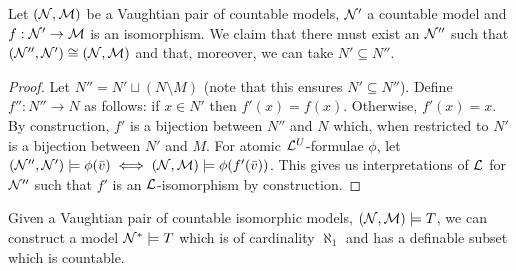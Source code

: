 \begin{lemma}\label{lemma_extend_isomorphically}
Let \((\mathcal{N}, \mathcal{M})\) be a Vaughtian pair of countable models, \(\mathcal{N}'\) a countable model and \(f:\mathcal{N}' \to \mathcal{M}\) is an isomorphism. 
We claim that there must exist an \(\mathcal{N}''\) such that \((\mathcal{N}'', \mathcal{N}') \cong (\mathcal{N}, \mathcal{M})\) and that, moreover, we can take \(N' \subseteq N''\). 
\end{lemma}

\begin{proof}
Let \(N'' = N' \sqcup (N \setminus M)\) (note that this ensures \(N' \subseteq N''\)).
Define \(f'': N'' \to N\) as follows: if \(x \in N'\) then \(f'(x) = f(x)\). 
Otherwise, \(f'(x) = x\). 
By construction, \(f'\) is a bijection between \(N''\) and \(N\) which, when restricted to \(N'\) is a bijection between  \(N'\) and \(M\). 
For atomic \(\mathcal{L}^U\)-formulae \(\phi\), let \((\mathcal{N}'', \mathcal{N}') \models \phi(\bar{v}) \iff (\mathcal{N}, \mathcal{M}) \models \phi(f'(\bar{v}))\).
This gives us interpretations of \(\mathcal{L}\) for \(\mathcal{N}''\) such that \(f'\) is an \(\mathcal{L}\)-isomorphism by construction. 
\end{proof}

\begin{theorem}\label{theorem_aleph_one_vaughtian_pair}
Given a Vaughtian pair of countable isomorphic models, \((\mathcal{N}, \mathcal{M}) \models T\), we can construct a model \(\mathcal{N}^* \models T\) which is of cardinality \(\aleph_1\) and has a definable subset which is countable.  
\end{theorem}

